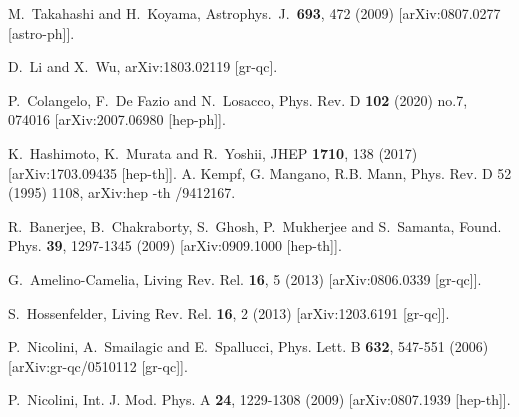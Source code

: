 \documentclass[aps,prd,showpacs,nofootinbib,floats,floatfix,preprintnumbers,groupedaddress,twocolumn]{revtex4-1}
\begin{document}
\begin{thebibliography}{9}
  M.~Takahashi and H.~Koyama,
  Astrophys.\ J.\  {\bf 693}, 472 (2009)
  [arXiv:0807.0277 [astro-ph]].
    
  D.~Li and X.~Wu,
  arXiv:1803.02119 [gr-qc].

P.~Colangelo, F.~De Fazio and N.~Losacco,
Phys. Rev. D \textbf{102} (2020) no.7, 074016
[arXiv:2007.06980 [hep-ph]].

  
K.~Hashimoto, K.~Murata and R.~Yoshii,
JHEP {\bf 1710}, 138 (2017)
[arXiv:1703.09435 [hep-th]].
 A. Kempf, G. Mangano, R.B. Mann, Phys. Rev. D 52 (1995) 1108, arXiv:hep -th /9412167.

R.~Banerjee, B.~Chakraborty, S.~Ghosh, P.~Mukherjee and S.~Samanta,
Found. Phys. \textbf{39}, 1297-1345 (2009)
[arXiv:0909.1000 [hep-th]].
 
G.~Amelino-Camelia,
Living Rev. Rel. \textbf{16}, 5 (2013)
[arXiv:0806.0339 [gr-qc]].
 
S.~Hossenfelder,
Living Rev. Rel. \textbf{16}, 2 (2013)
[arXiv:1203.6191 [gr-qc]].

P.~Nicolini, A.~Smailagic and E.~Spallucci,
Phys. Lett. B \textbf{632}, 547-551 (2006)
[arXiv:gr-qc/0510112 [gr-qc]].


P.~Nicolini,
Int. J. Mod. Phys. A \textbf{24}, 1229-1308 (2009)
[arXiv:0807.1939 [hep-th]].




\end{thebibliography}
\end{document}
